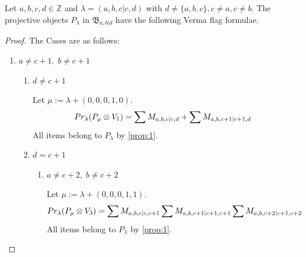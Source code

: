\begin{theorem}
  Let $a,b,c,d \in \mathbb{Z}$ and $\lambda = (a,b,c|c,d)$ with $d \neq \{a,b,c\}, c \neq a, c\neq b $. The projective objects $P_{\lambda}$ in $\mathfrak{B}_{a,b|d}$ have the following Verma flag formulae.
\end{theorem}
\begin{proof} The Cases are as follows:\par
\begin{enumerate}
  \item $ a \neq c+1,\; b \neq c+1 $ 
    \begin{enumerate}
      \item $ d \neq c+1 $ \par
        Let $\mu:=\lambda + (0,0,0,1,0) $.
        \begin{equation}\notag
          \begin{aligned}
            Pr_{\lambda}(P_\mu \otimes V_{1}) &=
\sum M_{a,b,c|c,d}
+\sum M_{a,b,c+1|c+1,d}
          \end{aligned}
        \end{equation}
All items belong to $P_\lambda$ by \cref{prop:1}.

      \item $ d = c+1 $
        \begin{enumerate}
          \item $ a\neq c+2,\; b\neq c+2 $\par
        Let $\mu:=\lambda + (0,0,0,1,1) $.
        \begin{equation}\notag
          \begin{aligned}
            Pr_{\lambda}(P_\mu \otimes V_{3}) &=
\sum M_{a,b,c|c,c+1}
\sum M_{a,b,c+1|c+1,c+1}
\sum M_{a,b,c+2|c+1,c+2}
          \end{aligned}
        \end{equation}
All items belong to $P_\lambda$ by \cref{prop:1}.


\end{enumerate}
\end{enumerate}
\end{enumerate}
\end{proof}
